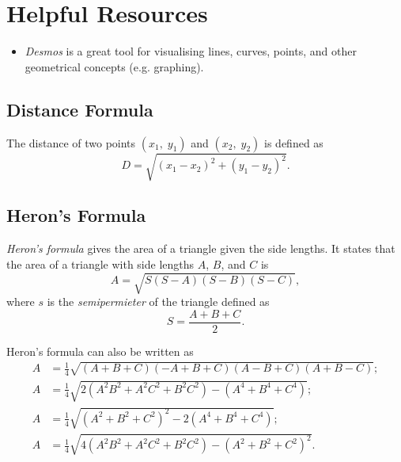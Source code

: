 \documentclass{problem-set}
\begin{document}
\pushnewpage

\section*{Helpful Resources}
\begin{itemize}
    \item \textit{Desmos} is a great tool for visualising lines, curves, points, and other geometrical concepts (e.g. graphing). 
\end{itemize}

\subsection*{Distance Formula}
The distance of two points $(x_1,\;y_1)$ and $(x_2,\;y_2)$ is defined as
\begin{equation*}
    D=\sqrt{(x_1-x_2)^2+(y_1-y_2)^2}.
\end{equation*}

\subsection*{Heron's Formula}
\textit{Heron's formula} gives the area of a triangle given the side lengths. It states that the area of a triangle with side lengths $A$, $B$, and $C$ is
\begin{equation*}
    A=\sqrt{S(S-A)(S-B)(S-C)},
\end{equation*}
where $s$ is the \textit{semipermieter} of the triangle defined as
\begin{equation*}
    S=\frac{A+B+C}{2}.
\end{equation*}

Heron's formula can also be written as
\begin{equation*}
    \begin{split}
        A &= \frac{1}{4}\sqrt{(A+B+C)(-A+B+C)(A-B+C)(A+B-C)};\\
        A &= \frac{1}{4}\sqrt{2(A^2B^2+A^2C^2+B^2C^2)-(A^4+B^4+C^4)};\\
        A &= \frac{1}{4}\sqrt{(A^2+B^2+C^2)^2-2(A^4+B^4+C^4)};\\
        A &= \frac{1}{4}\sqrt{4(A^2B^2+A^2C^2+B^2C^2)-(A^2+B^2+C^2)^2}.
    \end{split}
\end{equation*}
\end{document}
